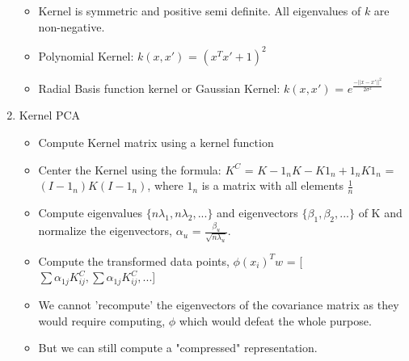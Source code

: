 \documentclass[a4paper]{article}
\begin{document}
\begin{enumerate}
\begin{itemize}
        \item Kernel is symmetric and positive semi definite. All eigenvalues of $k$ are non-negative.
        \item Polynomial Kernel: $k(x,x')$ = $(x^Tx' + 1)^2$
        \item Radial Basis function kernel or Gaussian Kernel: $k(x,x')$ = $e^{\frac{-||x-x'||^2}{2\sigma^2}}$
    \end{itemize}
    \item Kernel PCA
    \begin{itemize}
        \item Compute Kernel matrix using a kernel function
        \item Center the Kernel using the formula: $K^C$ = $K-1_nK-K1_n+1_nK1_n$ = $(I-1_n)K(I-1_n)$, where $1_n$ is a matrix with all elements $\frac{1}{n}$
        \item Compute eigenvalues $\{n\lambda_1, n\lambda_2, ...\}$ and eigenvectors $\{\beta_1, \beta_2, ...\}$ of K and normalize the eigenvectors, $\alpha_u$ = $\frac{\beta_u}{\sqrt{n\lambda_u}}$.
        \item Compute the transformed data points, $\phi(x_i)^Tw$ = [$\sum \alpha_{1j}K^C_{ij}, \sum \alpha_{1j}K^C_{ij}, ...$]
        \item We cannot 'recompute' the eigenvectors of the covariance matrix as they would require computing, $\phi$ which would defeat the whole purpose.
        \item But we can still compute a "compressed" representation.
    \end{itemize}
\end{enumerate}
\end{document}

